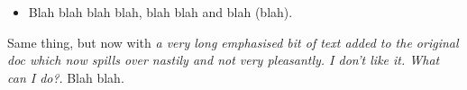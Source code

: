 \documentclass[11pt,a4paper,twoside,notitlepage]{article}
\begin{document}
\begin{itemize}

\item Blah blah blah blah, blah blah and blah (blah).  

\end{itemize}

Same thing, but now with \emph{a very long emphasised bit of text added
to the original doc which now spills over nastily and not very pleasantly. I
don't like it. What can I do?}.  Blah blah.  
\end{document}
